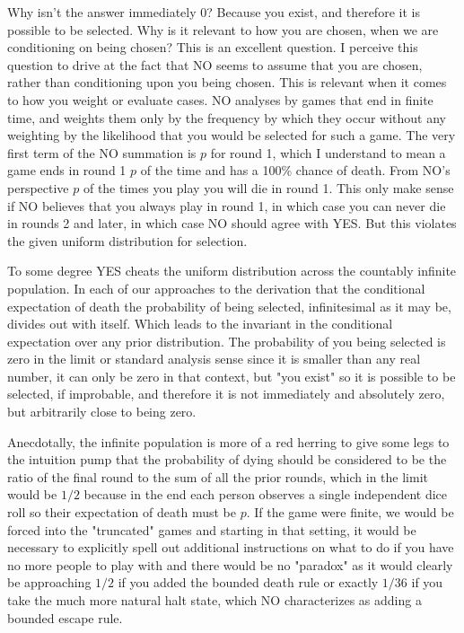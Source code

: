 \documentclass[article,twocolumn]{memoir}
\begin{document}
Why isn't the answer immediately 0?
Because you exist, and therefore it is possible to be selected.
Why is it relevant to how you are chosen, when we are conditioning on being chosen? 
This is an excellent question.
I perceive this question to drive at the fact that NO seems to assume that you are chosen, rather than conditioning upon you being chosen. 
This is relevant when it comes to how you weight or evaluate cases.
NO analyses by games that end in finite time, and weights them only by the frequency by which they occur without any weighting by the likelihood that you would be selected for such a game.
The very first term of the NO summation is $p$ for round 1, which I understand to mean a game ends in round 1 $p$ of the time and has a 100\% chance of death.
From NO's perspective $p$ of the times you play you will die in round 1.
This only make sense if NO believes that you always play in round 1, in which case you can never die in rounds 2 and later, in which case NO should agree with YES.
But this violates the given uniform distribution for selection.

To some degree YES cheats the uniform distribution across the countably infinite population.
In each of our approaches to the derivation that the conditional expectation of death the probability of being selected, infinitesimal as it may be, divides out with itself.
Which leads to the invariant in the conditional expectation over any prior distribution.
The probability of you being selected is zero in the limit or standard analysis sense since it is smaller than any real number, it can only be zero in that context, but "you exist" so it is possible to be selected, if improbable, and therefore it is not immediately and absolutely zero, but arbitrarily close to being zero.

Anecdotally, the infinite population is more of a red herring to give some legs to the intuition pump that the probability of dying should be considered to be the ratio of the final round to the sum of all the prior rounds, which in the limit would be $1/2$ because in the end each person observes a single independent dice roll so their expectation of death must be $p$.
If the game were finite, we would be forced into the "truncated" games and starting in that setting, it would be necessary to explicitly spell out additional instructions on what to do if you have no more people to play with and there would be no "paradox" as it would clearly be approaching $1/2$ if you added the bounded death rule or exactly $1/36$ if you take the much more natural halt state, which NO characterizes as adding a bounded escape rule.
\end{document}
